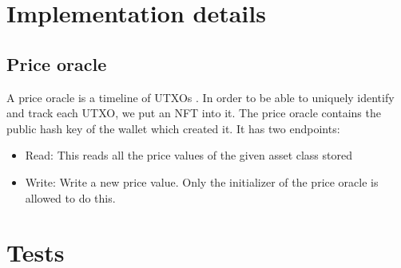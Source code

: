 \documentclass{article} %
\begin{document}
\section{Implementation details}


\subsection{Price oracle}


A price oracle is a timeline of UTXOs . In
order to be able to uniquely identify and track each UTXO, we put an NFT into
it. The price oracle contains the public hash key of the wallet which created
it. It has two endpoints:
\begin{itemize}
  \item Read: This reads all the price values of the given asset class stored
  \item Write: Write a new price value. Only the initializer of the price oracle
    is allowed to do this.
\end{itemize}

\section{Tests}


% 
\end{document}
